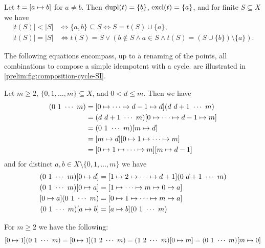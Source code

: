 Let $t = \SI{a}{b}$ for $a \ne b$. Then $\dupl{t} = \{b\}$, $\excl{t} = \{a\}$, and 
for finite $S \subseteq X$ we have
\begin{align}
	|t(S)| < |S| & \Leftrightarrow \{a,b\} \subseteq S \Leftrightarrow S = t(S) \cup \{a\}, \label{prelim:eqn:SIsmaller} \\
	|t(S)| = |S| & \Leftrightarrow t(S) = S \lor ( b \notin S \land a \in S \land t(S) = ( S \cup \{b\} ) \setminus \{a\} ). \label{prelim:eqn:SIequalsize}
\end{align}

The following equations encompass, up to a renaming of the points,
all combinations to compose a simple idempotent with a cycle.
are illustrated in \cref{prelim:fig:composition-cycle-SI}.

\begin{proposition} \label{prelim:trans:prop:cycle-SI-composition}
	Let $m \ge 2$, $\{0,1,\ldots,m\} \subseteq X$,
	and $0 < d \le m$. Then we have
	\begin{align}
		[0 \mapsto d ](0 ~ 1 ~\cdots ~ m) 
		& = [0 \mapsto \cdots \mapsto d - 1 \mapsto d](d ~ d+1 ~ \cdots ~ m)  \label{prelim:eqn:SIcycle1} \\
		& = (d ~ d+1 ~ \cdots ~ m)[0 \mapsto \cdots \mapsto d - 1 \mapsto m] \\
		& = \concat{[m\mapsto d]}{(0 ~ 1 ~ \cdots ~ m)} \\
		& = \concat{[0 \mapsto 1 \mapsto \cdots \mapsto m]}{[m\mapsto d]} \\
		& = \concat{[m\mapsto d-1]}{[0 \mapsto 1 \mapsto \cdots \mapsto m]}
	\end{align}
	and for distinct $a,b \in X \setminus \{0,1,\ldots,m\}$ we have
	\begin{align}
		(0 ~ 1 ~\cdots ~ m)[ 0 \mapsto d ] & = [1 \mapsto 2 \mapsto \cdots \mapsto d+1](0 ~ d + 1 ~ \cdots ~ m) \label{prelim:eqn:SIcycle2} \\
		(0 ~ 1 ~ \cdots ~ m)[0 \mapsto a] & = [1 \mapsto \cdots \mapsto m \mapsto 0 \mapsto a] \label{prelim:eqn:SIcycle4} \\
		[0 \mapsto a](0 ~ 1 ~ \cdots ~ m) & = [0 \mapsto 1 \mapsto \cdots \mapsto m \mapsto a] \label{prelim:eqn:SIcycle5} \\
		(0 ~ 1 ~ \cdots ~ m)\SI{a}{b} & = \SI{a}{b}(0 ~ 1 ~ \cdots ~ m) \label{prelim:eqn:SIcycle6}
	\end{align} 
\end{proposition}

\begin{corollary} For $m \ge 2$ we have the following:
	\[
		[0 \mapsto 1](0 ~ 1 ~ \cdots ~ m) 
		= [0 \mapsto 1 ](1 ~ 2 ~ \cdots ~ m) 
		= (1 ~ 2 ~ \cdots ~ m)[ 0 \mapsto m] 
		= \concat{[m \mapsto 0]}{(0 ~ 1 ~ \cdots ~ m)}
	\]
\end{corollary}

